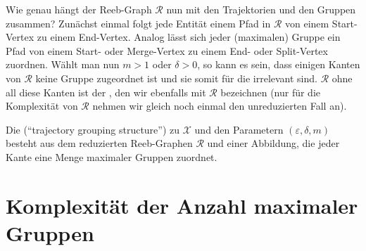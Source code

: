 Wie genau hängt der Reeb-Graph $\mathcal{R}$ nun mit den Trajektorien und den Gruppen zusammen? 
Zunächst einmal folgt jede Entität einem Pfad in $\mathcal{R}$ von einem Start-Vertex zu einem End-Vertex.
Analog lässt sich jeder (maximalen) Gruppe ein Pfad von einem Start- oder Merge-Vertex zu einem End- oder Split-Vertex zuordnen.
Wählt man nun $m > 1$ oder $\delta > 0$, so kann es sein, dass einigen Kanten von $\mathcal{R}$ keine Gruppe zugeordnet ist und sie somit für die \GrpStruktur irrelevant sind.
$\mathcal{R}$ ohne all diese Kanten ist der , den wir ebenfalls mit $\mathcal{R}$ bezeichnen (nur für die Komplexität von $\mathcal{R}$ nehmen wir gleich noch einmal den unreduzierten Fall an).


\begin{definition}[{name=[{\GrpStruktur}]}]
	Die \Index{\GrpStruktur} (\enquote{trajectory grouping structure}) zu $\mathcal{X}$ und den Parametern $(\varepsilon,\delta,m)$ besteht aus dem reduzierten Reeb-Graphen $\mathcal{R}$ und einer Abbildung, die jeder Kante eine Menge maximaler Gruppen zuordnet.
\end{definition}



\section{Komplexität der Anzahl maximaler Gruppen} %
\label{sec:max_gruppen_komplex}


